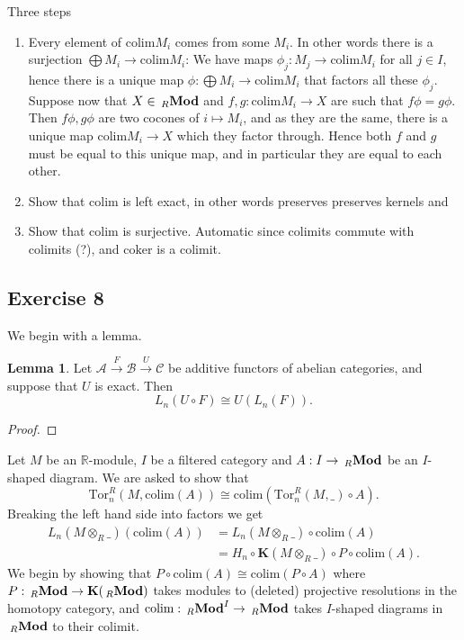 \documentclass{article}
\theoremstyle{definition}
\newtheorem{lemma}[theorem]{Lemma}
\newcommand{\R}{\mathbb{R}}
\newcommand{\coker}{\text{coker}}
\newcommand{\colim}{\text{colim}}
\newcommand{\Tor}{\text{Tor}}
\newcommand{\HK}{\mathbf{K}}
\newcommand{\catname}[1]{{\normalfont\textbf{#1}}}
\newcommand{\RMod}{\,_{R}\catname{Mod}}
\begin{document}
Three steps
\begin{enumerate}
	\item Every element of $\colim M_i$ comes from some $M_i$. In other words
		there is a surjection $\bigoplus M_i \to \colim M_i$: We have maps
		$\phi_j : M_j \to \colim M_i$ for all $j \in I$, hence there is a
		unique map $\phi : \bigoplus M_i \to \colim M_i$ that factors all these
		$\phi_j$. Suppose now that $X \in \RMod$ and $f, g : \colim M_i \to X$
		are such that $f\phi = g \phi$. Then $f\phi, g\phi$ are two cocones of
		$i \mapsto M_i$, and as they are the same, there is a unique map
		$\colim M_i \to X$ which they factor through. Hence both $f$ and $g$
		must be equal to this unique map, and in particular they are equal to
		each other.
	\item Show that $\colim$ is left exact, in other words preserves preserves
		kernels and 
	\item Show that $\colim$ is surjective. Automatic since colimits commute
		with colimits (?), and $\coker$ is a colimit.
\end{enumerate}

\subsection*{Exercise 8}

We begin with a lemma.
\begin{lemma}
	Let $\mathcal{A} \xrightarrow{F} \mathcal{B} \xrightarrow{U} \mathcal{C}$
	be additive functors of abelian categories, and suppose that $U$ is exact.
	Then
	\[
		L_n(U \circ F)
		\cong
		U(L_n(F)).
	\] 
\end{lemma}
\begin{proof}
		
\end{proof}

Let $M$ be an $\R$-module, $I$ be a filtered category and $A : I \to \RMod$ be
an $I$-shaped diagram. We are asked to show that 
\[
	\Tor^{R}_{n}(M, \colim(A))
	\cong
	\colim(\Tor^{R}_{n}(M, \_) \circ A).
\] 
Breaking the left hand side into factors we get
\begin{align*}
	L_{n}(M \otimes_{R} \_)(\colim(A))
	&= 
	L_{n}(M \otimes_{R} \_) \circ \colim(A) \\
	&=
	H_n \circ \HK(M \otimes_{R} \_) \circ P \circ \colim(A).
\end{align*}
We begin by showing that $P \circ \colim(A) \cong \colim(P \circ A)$ where $P :
\RMod \to \HK(\RMod)$ takes modules to (deleted) projective resolutions in the
homotopy category, and $\colim : \RMod^{I} \to \RMod$ takes $I$-shaped diagrams
in $\RMod$ to their colimit.
\end{document}
